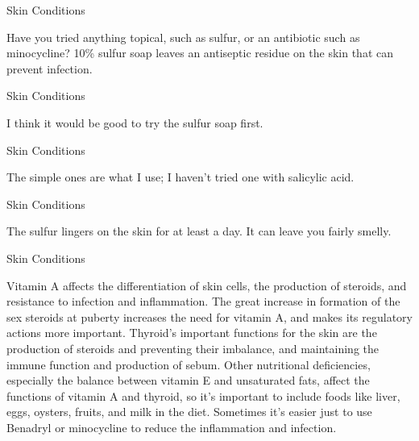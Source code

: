 \documentclass[11pt,oneside,openany,extrafontsizes]{memoir}
\begin{document}
\begin{standalonequote}{Skin Conditions}

    \begin{answer}
        Have you tried anything topical, such as sulfur, or an antibiotic such as minocycline? 10\% sulfur soap leaves an antiseptic residue on the skin that can prevent infection.
    \end{answer}
\end{standalonequote}

\begin{standalonequote}{Skin Conditions}

    \begin{answer}
        I think it would be good to try the sulfur soap first.
    \end{answer}
\end{standalonequote}

\begin{standalonequote}{Skin Conditions}

    \begin{answer}
        The simple ones are what I use; I haven't tried one with salicylic acid.
    \end{answer}
\end{standalonequote}

\begin{standalonequote}{Skin Conditions}

    \begin{answer}
        The sulfur lingers on the skin for at least a day. It can leave you fairly smelly.
    \end{answer}
\end{standalonequote}

\begin{standalonequote}{Skin Conditions}

    \begin{answer}
        Vitamin A affects the differentiation of skin cells, the production of steroids, and resistance to infection and inflammation. The great increase in formation of the sex steroids at puberty increases the need for vitamin A, and makes its regulatory actions more important. Thyroid's important functions for the skin are the production of steroids and preventing their imbalance, and maintaining the immune function and production of sebum. Other nutritional deficiencies, especially the balance between vitamin E and unsaturated fats, affect the functions of vitamin A and thyroid, so it's important to include foods like liver, eggs, oysters, fruits, and milk in the diet. Sometimes it's easier just to use Benadryl or minocycline to reduce the inflammation and infection.
    \end{answer}
\end{standalonequote}
\end{document}

